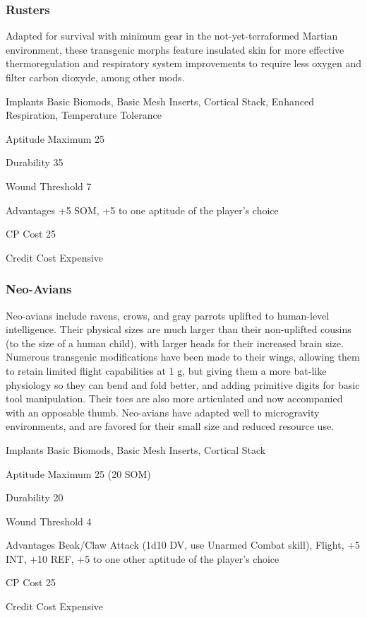 \subsubsection{Rusters}
Adapted for survival with minimum gear in the not-yet-terraformed Martian
environment, these transgenic morphs feature insulated skin for more effective
thermoregulation and respiratory system improvements to require less oxygen
and filter carbon dioxyde, among other mods.

\begin{description*}
\item[Implants] Basic Biomods, Basic Mesh Inserts, Cortical Stack, Enhanced
  Respiration, Temperature Tolerance
\item[Aptitude Maximum] 25 
\item[Durability] 35 
\item[Wound Threshold] 7 
\item[Advantages] +5 SOM, +5 to one aptitude of the player’s choice 
\item[CP Cost] 25 
\item[Credit Cost] Expensive 
\end{description*}

\subsubsection{Neo-Avians}
Neo-avians include ravens, crows, and gray parrots uplifted to human-level
intelligence. Their physical sizes are much larger than their non-uplifted
cousins (to the size of a human child), with larger heads for their increased
brain size. Numerous transgenic modifications have been made to their wings,
allowing them to retain limited flight capabilities at 1 g, but giving them a
more bat-like physiology so they can bend and fold better, and adding primitive
digits for basic tool manipulation. Their toes are also more articulated and
now accompanied with an opposable thumb. Neo-avians have adapted well to
microgravity environments, and are favored for their small size and reduced
resource use.

\begin{description*}
\item[Implants] Basic Biomods, Basic Mesh Inserts, Cortical Stack
\item[Aptitude Maximum] 25 (20 SOM) 
\item[Durability] 20 
\item[Wound Threshold] 4 
\item[Advantages] Beak/Claw Attack (1d10 DV, use Unarmed Combat skill), Flight,
  +5 INT, +10 REF, +5 to one other aptitude of the player’s choice
\item[CP Cost] 25 
\item[Credit Cost] Expensive 
\end{description*}

